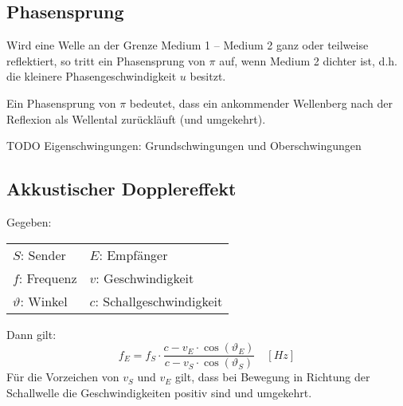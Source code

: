 \subsection{Phasensprung}

Wird eine Welle an der Grenze Medium 1 -- Medium 2 ganz oder teilweise
reflektiert, so tritt ein Phasensprung von $\pi$ auf, wenn Medium 2 dichter ist,
d.h. die kleinere Phasengeschwindigkeit $u$ besitzt.

Ein Phasensprung von $\pi$ bedeutet, dass ein ankommender Wellenberg nach der
Reflexion als Wellental zurückläuft (und umgekehrt).

TODO Eigenschwingungen: Grundschwingungen und Oberschwingungen

\subsection{Akkustischer Dopplereffekt}

Gegeben:

\begin{tabular}{ll}
$S$: Sender & $E$: Empfänger \\
$f$: Frequenz & $v$: Geschwindigkeit \\
$\vartheta$: Winkel & $c$: Schallgeschwindigkeit \\
\end{tabular}

Dann gilt:
\[
	f_E = f_S \cdot \frac{c - v_E \cdot \cos(\vartheta_E)}{c - v_S \cdot \cos (\vartheta_S)}
	\quad \left[ Hz \right]
\]
Für die Vorzeichen von $v_S$ und $v_E$ gilt, dass bei Bewegung in Richtung der
Schallwelle die Geschwindigkeiten positiv sind und umgekehrt.
